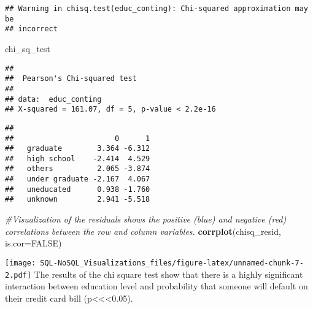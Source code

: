 \documentclass[]{article}
\newenvironment{Shaded}{\begin{snugshade}}{\end{snugshade}}
\newcommand{\KeywordTok}[1]{\textcolor[rgb]{0.13,0.29,0.53}{\textbf{#1}}}
\newcommand{\DataTypeTok}[1]{\textcolor[rgb]{0.13,0.29,0.53}{#1}}
\newcommand{\DecValTok}[1]{\textcolor[rgb]{0.00,0.00,0.81}{#1}}
\newcommand{\CommentTok}[1]{\textcolor[rgb]{0.56,0.35,0.01}{\textit{#1}}}
\newcommand{\OtherTok}[1]{\textcolor[rgb]{0.56,0.35,0.01}{#1}}
\newcommand{\OperatorTok}[1]{\textcolor[rgb]{0.81,0.36,0.00}{\textbf{#1}}}
\newcommand{\NormalTok}[1]{#1}
\begin{document}
\begin{verbatim}
## Warning in chisq.test(educ_conting): Chi-squared approximation may be
## incorrect
\end{verbatim}

\begin{Shaded}
\begin{Highlighting}[]
\NormalTok{chi_sq_test}
\end{Highlighting}
\end{Shaded}

\begin{verbatim}
## 
##  Pearson's Chi-squared test
## 
## data:  educ_conting
## X-squared = 161.07, df = 5, p-value < 2.2e-16
\end{verbatim}

\begin{Shaded}
\end{Shaded}

\begin{verbatim}
##                 
##                       0      1
##   graduate        3.364 -6.312
##   high school    -2.414  4.529
##   others          2.065 -3.874
##   under graduate -2.167  4.067
##   uneducated      0.938 -1.760
##   unknown         2.941 -5.518
\end{verbatim}

\begin{Shaded}
\begin{Highlighting}[]
\CommentTok{#Visualization of the residuals shows the positive (blue) and negative (red) correlations between the row and column variables.}
\KeywordTok{corrplot}\NormalTok{(chisq_resid, }\DataTypeTok{is.cor=}\OtherTok{FALSE}\NormalTok{)}
\end{Highlighting}
\end{Shaded}

\texttt{[image: SQL-NoSQL\_Visualizations\_files/figure-latex/unnamed-chunk-7-2.pdf]}
The results of the chi square test show that there is a highly
significant interaction between education level and probability that
someone will default on their credit card bill
(p\textless{}\textless{}\textless{}0.05).
\end{document}
